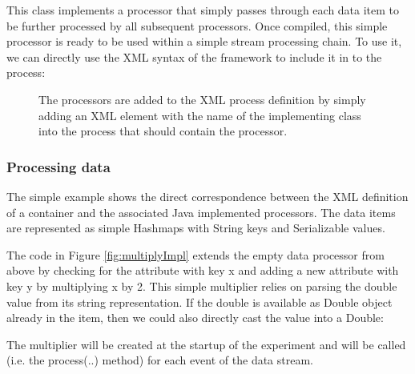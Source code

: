 This class implements a processor that simply passes through each data
item to be further processed by all subsequent processors.  Once
compiled, this simple processor is ready to be used within a simple
stream processing chain. To use it, we can directly use the XML syntax
of the \streams framework to include it in to the process:

\begin{figure}[h!]
  \caption{\label{fig:multiplyXML}The processors are added to the XML process definition by simply adding an XML element with the name of the implementing class into the process that should contain the processor.}
\end{figure}


\subsubsection*{Processing data}
The simple example shows the direct correspondence between the XML
definition of a container and the associated Java implemented
processors. The data items are represented as simple Hashmaps with
{\ttfamily String} keys and {\ttfamily Serializable} values.

The code in Figure \ref{fig:multiplyImpl} extends the empty data
processor from above by checking for the attribute with key {\ttfamily
x} and adding a new attribute with key {\ttfamily y} by multiplying
{\ttfamily x} by 2. This simple multiplier relies on parsing the double value from its
string representation. If the double is available as Double object
already in the item, then we could also directly cast the value into a
Double:

\begin{figure}[h!]
\end{figure}

The multiplier will be created at the startup of the experiment and
will be called (i.e. the {\ttfamily process(..)} method) for each
event of the data stream.

